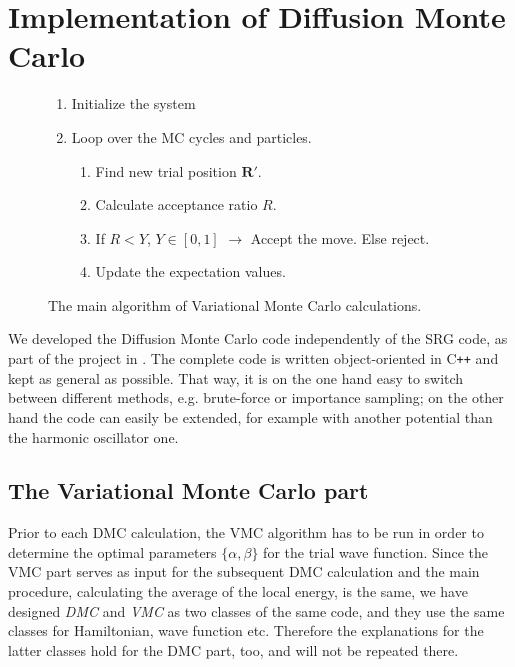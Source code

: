 \section{Implementation of Diffusion Monte Carlo}
\begin{figure}
\begin{framed}
\begin{enumerate}
\item Initialize the system
\item Loop over the MC cycles and particles.
\begin{enumerate}
\item Find new trial position $\mathbf{R}'$.
\item Calculate acceptance ratio $R$.
\item If $R<Y$, $Y\in[0,1]$ $\rightarrow$ Accept the move. Else reject.
\item Update the expectation values.
\end{enumerate}
\end{enumerate}
\end{framed}
\caption{The main algorithm of Variational Monte Carlo calculations.}
\label{fig:VMCalgo}
\end{figure}
We developed the Diffusion Monte Carlo code independently of the SRG code, as part of the project in \cite{FYS4411}.  The complete code is  written object-oriented in C{}\verb!++! and kept as general as possible. That way, it is on the one hand easy to switch between different methods, e.g. brute-force or importance sampling; on the other hand the code can easily be extended, for example with another potential than the harmonic oscillator one.

\subsection{The Variational Monte Carlo part}

Prior to each DMC calculation, the VMC algorithm has to be run in order to determine the optimal parameters $\lbrace\alpha, \beta\rbrace$ for the trial wave function. Since the VMC part serves as input for the subsequent DMC calculation and the main procedure, calculating the average of the local energy, is the same, we have designed \textit{DMC} and \textit{VMC} as two classes of the same code, and they use the same classes for Hamiltonian, wave function etc. Therefore the explanations for the latter classes hold for the DMC part, too, and will not be repeated there.


